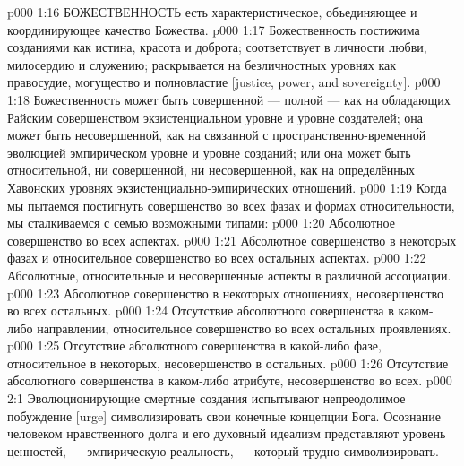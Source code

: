 \vs p000 1:16 \pc БОЖЕСТВЕННОСТЬ есть характеристическое, объединяющее и координирующее качество Божества.
\vs p000 1:17 Божественность постижима созданиями как истина, красота и доброта; соответствует в личности любви, милосердию и служению; раскрывается на безличностных уровнях как правосудие, могущество и полновластие [justice, power, and sovereignty].
\vs p000 1:18 Божественность может быть совершенной --- полной --- как на обладающих Райским совершенством экзистенциальном уровне и уровне создателей; она может быть несовершенной, как на связанной с пространственно\hyp{}временн\'ой эволюцией эмпирическом уровне и уровне созданий; или она может быть относительной, ни совершенной, ни несовершенной, как на определённых Хавонских уровнях экзистенциально\hyp{}эмпирических отношений.
\vs p000 1:19 \pc Когда мы пытаемся постигнуть совершенство во всех фазах и формах относительности, мы сталкиваемся с семью возможными типами:
\vs p000 1:20 \bibnobreakspace Абсолютное совершенство во всех аспектах.
\vs p000 1:21 \bibnobreakspace Абсолютное совершенство в некоторых фазах и относительное совершенство во всех остальных аспектах.
\vs p000 1:22 \bibnobreakspace Абсолютные, относительные и несовершенные аспекты в различной ассоциации.
\vs p000 1:23 \bibnobreakspace Абсолютное совершенство в некоторых отношениях, несовершенство во всех остальных.
\vs p000 1:24 \bibnobreakspace Отсутствие абсолютного совершенства в каком\hyp{}либо направлении, относительное совершенство во всех остальных проявлениях.
\vs p000 1:25 \bibnobreakspace Отсутствие абсолютного совершенства в какой\hyp{}либо фазе, относительное в некоторых, несовершенство в остальных.
\vs p000 1:26 \bibnobreakspace Отсутствие абсолютного совершенства в каком\hyp{}либо атрибуте, несовершенство во всех.
\vs p000 2:1 Эволюционирующие смертные создания испытывают непреодолимое побуждение [urge] символизировать свои конечные концепции Бога. Осознание человеком нравственного долга и его духовный идеализм представляют уровень ценностей, --- эмпирическую реальность, --- который трудно символизировать.
